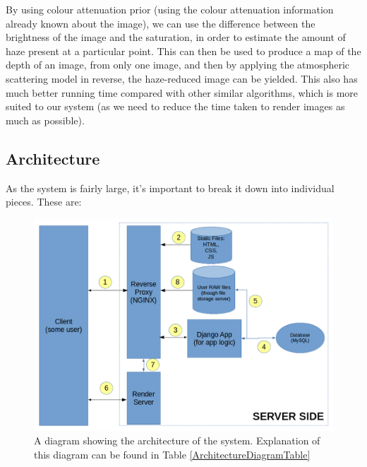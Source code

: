 \documentclass[12pt,a4paper]{article}
\begin{document}
By using colour attenuation prior (using the colour attenuation information already known about the image), we can use the difference between
the brightness of the image and the saturation, in order to estimate the amount of haze present at a particular point. This can then be used to
produce a map of the depth of an image, from only one image, and then by applying the atmospheric scattering model in reverse, the haze-reduced image
can be yielded. This also has much better running time compared with other similar algorithms, which is more suited to our system (as we need to reduce the
time taken to render images as much as possible). \cite{ColourAttenuationPriorAlg}

\subsection{Architecture}
As the system is fairly large, it's important to break it down into individual pieces. These are:
\begin{figure}[h]
    \centering
    \includegraphics[width=1\textwidth]{architecturediagram}
    \caption{A diagram showing the architecture of the system. Explanation of this diagram can be found in Table \ref{ArchitectureDiagramTable}}
    \label{ArchitectureDiagram}
\end{figure}
\end{document}
